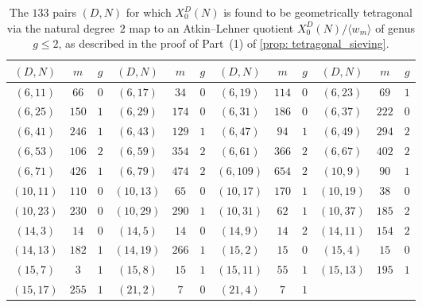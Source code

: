\documentclass[11pt,reqno]{amsart}
\theoremstyle{definition}
\begin{document}
{
\begin{longtable}{|c|c|c||c|c|c||c|c|c||c|c|c|}
\caption{The $133$ pairs $(D,N)$ for which $X_0^D(N)$ is found to be geometrically tetragonal via the natural degree~$2$ map to an Atkin--Lehner quotient $X_0^D(N)/\langle w_m \rangle$ of genus $g \leq 2$, as described in the proof of Part~(1) of \cref{prop: tetragonal_sieving}.}\label{table: tetragonal_AL2} \\ \hline 
$(D,N)$ & $m$ & $g$ & $(D,N)$ & $m$ & $g$  & $(D,N)$ & $m$ & $g$  & $(D,N)$ & $m$ & $g$ \\ \hline  \hline
$ (
6 , 11 )$ & $
66 $ & $ 0 $
 & 
$ (
6 , 17 )$ & $
34 $ & $ 0 $
&
$ (
6 , 19 )$ & $
114 $ & $ 0 $
&
$ (
6 , 23 )$ & $
69 $ & $ 1 $
\\ \hline
$ (
6 , 25 )$ & $
150 $ & $ 1 $
 & 
$ (
6 , 29 )$ & $
174 $ & $ 0 $
&
$ (
6 , 31 )$ & $
186 $ & $ 0 $
 & 
$ (
6 , 37 )$ & $
222 $ & $ 0 $
\\ \hline
$ (
6 , 41 )$ & $
246 $ & $ 1 $
&
$ (
6 , 43 )$ & $
129 $ & $ 1 $
&
$ (
6 , 47 )$ & $
94 $ & $ 1 $
 & 
$ (
6 , 49 )$ & $
294 $ & $ 2 $
\\ \hline
$ (
6 , 53 )$ & $
106 $ & $ 2 $
 & 
$ (
6 , 59 )$ & $
354 $ & $ 2 $
&
$ (
6 , 61 )$ & $
366 $ & $ 2 $
&
$ (
6 , 67 )$ & $
402 $ & $ 2 $
\\ \hline
$ (
6 , 71 )$ & $
426 $ & $ 1 $
 & 
$ (
6 , 79 )$ & $
474 $ & $ 2 $
&
$ (
6 , 109 )$ & $
654 $ & $ 2 $
 & 
$ (
10 , 9 )$ & $
90 $ & $ 1 $
\\ \hline
$ (
10 , 11 )$ & $
110 $ & $ 0 $
&
$ (
10 , 13 )$ & $
65 $ & $ 0 $
&
$ (
10 , 17 )$ & $
170 $ & $ 1 $
 & 
$ (
10 , 19 )$ & $
38 $ & $ 0 $
\\ \hline
$ (
10 , 23 )$ & $
230 $ & $ 0 $
 & 
$ (
10 , 29 )$ & $
290 $ & $ 1 $
&
$ (
10 , 31 )$ & $
62 $ & $ 1 $
&
$ (
10 , 37 )$ & $
185 $ & $ 2 $
\\ \hline
$ (
14 , 3 )$ & $
14 $ & $ 0 $
 & 
$ (
14 , 5 )$ & $
14 $ & $ 0 $
&
$ (
14 , 9 )$ & $
14 $ & $ 2 $
 & 
$ (
14 , 11 )$ & $
154 $ & $ 2 $
\\ \hline
$ (
14 , 13 )$ & $
182 $ & $ 1 $
&
$ (
14 , 19 )$ & $
266 $ & $ 1 $
&
$ (
15 , 2 )$ & $
15 $ & $ 0 $
 & 
$ (
15 , 4 )$ & $
15 $ & $ 0 $
\\ \hline
$ (
15 , 7 )$ & $
3 $ & $ 1 $
 & 
$ (
15 , 8 )$ & $
15 $ & $ 1 $
&
$ (
15 , 11 )$ & $
55 $ & $ 1 $
&
$ (
15 , 13 )$ & $
195 $ & $ 1 $
\\ \hline
$ (
15 , 17 )$ & $
255 $ & $ 1 $
 & 
$ (
21 , 2 )$ & $
7 $ & $ 0 $
&
$ (
21 , 4 )$ & $
7 $ & $ 1 $

\end{longtable}}
\end{document}
